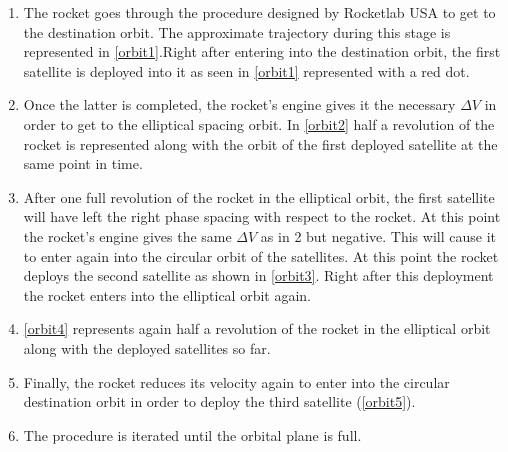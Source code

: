 \begin{enumerate}
\item The rocket goes through the procedure designed by Rocketlab USA to get to the destination orbit. The approximate trajectory during this stage is represented in \ref{orbit1}.Right after entering into the destination orbit, the first satellite is deployed into it as seen in \ref{orbit1} represented with a red dot.
\item Once the latter is completed, the rocket's engine gives it the necessary $\Delta V$ in order to get to the elliptical spacing orbit. In \ref{orbit2} half a revolution of the rocket is represented along with the orbit of the first deployed satellite at the same point in time.
\item After one full revolution of the rocket in the elliptical orbit, the first satellite will have left the right phase spacing with respect to the rocket. At this point the rocket's engine gives the same $\Delta V$ as in 2 but negative. This will cause it to enter again into the circular orbit of the satellites. At this point the rocket deploys the second satellite as shown in \ref{orbit3}. Right after this deployment the rocket enters into the elliptical orbit again.
\item \ref{orbit4} represents again half a revolution of the rocket in the elliptical orbit along with the deployed satellites so far.
\item Finally, the rocket reduces its velocity again to enter into the circular destination orbit in order to deploy the third satellite (\ref{orbit5}).
\item The procedure is iterated until the orbital plane is full.
\newline\newline
\end{enumerate}
